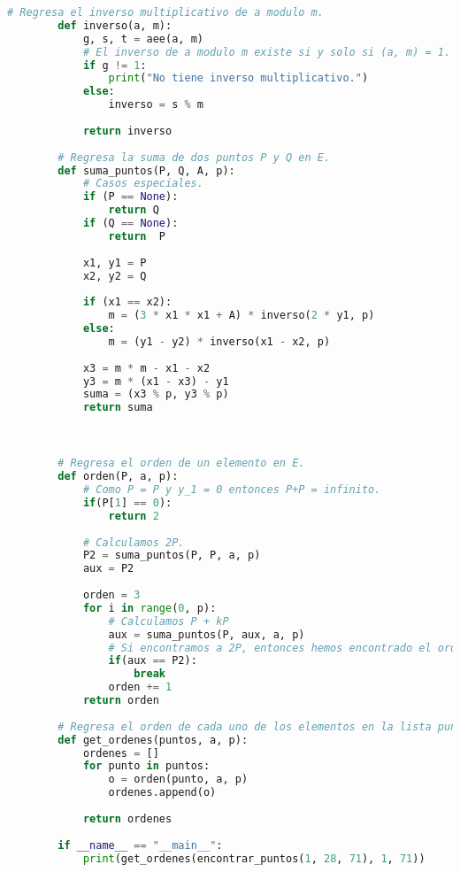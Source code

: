 \documentclass[letterpaper,11pt]{article}
\begin{document}
\begin{enumerate}
\begin{enumerate}
\begin{lstlisting}[language=Python]
        # Regresa el inverso multiplicativo de a modulo m.
        def inverso(a, m):
            g, s, t = aee(a, m)
            # El inverso de a modulo m existe si y solo si (a, m) = 1.
            if g != 1:
                print("No tiene inverso multiplicativo.")
            else:
                inverso = s % m
            
            return inverso
            
        # Regresa la suma de dos puntos P y Q en E. 
        def suma_puntos(P, Q, A, p):
            # Casos especiales.
            if (P == None):
                return Q
            if (Q == None):
                return  P
                
            x1, y1 = P
            x2, y2 = Q
            
            if (x1 == x2):
                m = (3 * x1 * x1 + A) * inverso(2 * y1, p)
            else:
                m = (y1 - y2) * inverso(x1 - x2, p)
                
            x3 = m * m - x1 - x2
            y3 = m * (x1 - x3) - y1
            suma = (x3 % p, y3 % p)
            return suma
        


        # Regresa el orden de un elemento en E.
        def orden(P, a, p):
            # Como P = P y y_1 = 0 entonces P+P = infinito.
            if(P[1] == 0):
                return 2
            
            # Calculamos 2P.
            P2 = suma_puntos(P, P, a, p)
            aux = P2
            
            orden = 3
            for i in range(0, p):
                # Calculamos P + kP
                aux = suma_puntos(P, aux, a, p)
                # Si encontramos a 2P, entonces hemos encontrado el orden.
                if(aux == P2):
                    break
                orden += 1
            return orden
        
        # Regresa el orden de cada uno de los elementos en la lista puntos.
        def get_ordenes(puntos, a, p):
            ordenes = []
            for punto in puntos:
                o = orden(punto, a, p)
                ordenes.append(o)
            
            return ordenes
            
        if __name__ == "__main__":
            print(get_ordenes(encontrar_puntos(1, 28, 71), 1, 71))
        \end{lstlisting}
        

\end{enumerate}
\end{enumerate}
\end{document}
